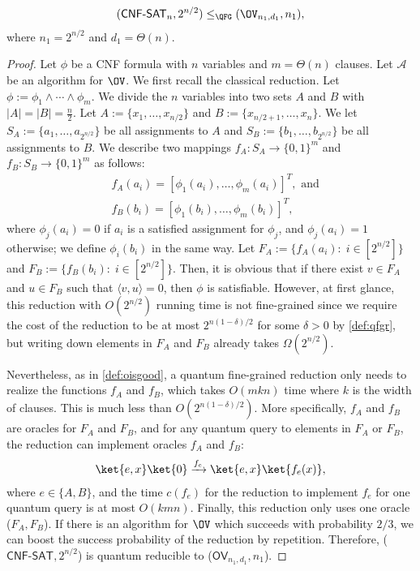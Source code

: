 \begin{lemma}\label{lem:sat_q_ov}
\begin{align}
    (\mathsf{CNF\text{-}SAT}_{n},2^{n/2})\leq_{\QFG} (\OV_{n_1,d_1},n_1),
\end{align}
where $n_1=2^{n/2}$ and $d_1=\Theta(n)$.
\end{lemma}
\begin{proof}
Let $\phi$ be a CNF formula with $n$ variables and $m=\Theta(n)$ clauses. Let $\mathcal{A}$ be an algorithm for $\OV$. We first recall the classical reduction. Let $\phi := \phi_1\wedge \cdots \wedge\phi_m$. 
We divide the $n$ variables into two sets $A$ and $B$ with $|A| = |B| = \frac{n}{2}$. Let $A:=\{x_1,\dots,x_{n/2}\}$ and $B:= \{x_{n/2+1},\dots,x_{n}\}$. We let $S_A:=\{a_1,\dots,a_{2^{n/2}}\}$ be all assignments to $A$ and $S_B:=\{b_1,\dots,b_{2^{n/2}}\}$ be all assignments to $B$. We describe two mappings $f_A: S_A\rightarrow \{0,1\}^m$ and $f_B:S_B\rightarrow \{0,1\}^m$ as follows: 
\begin{align}
    &f_A(a_i) = [\phi_1(a_i),\dots,\phi_m(a_i)]^T, \text{ and}\\
    &f_B(b_i) = [\phi_1(b_i),\dots,\phi_m(b_i)]^T,
\end{align}
where $\phi_j(a_i) = 0$ if $a_i$ is a satisfied assignment for $\phi_j$, and  $\phi_j(a_i) = 1$ otherwise; we define $\phi_i(b_i)$ in the same way. Let $F_A:= \{f_A(a_i):\; i\in[2^{n/2}]\}$ and $F_B:= \{f_B(b_i):\; i\in[2^{n/2}]\}$. Then, it is obvious that if there exist $v\in F_A$ and $u\in F_B$ such that $\langle v, u \rangle=0$, then $\phi$ is satisfiable. However, at first glance, this reduction with $O(2^{n/2})$ running time is not fine-grained since we require the cost of the reduction to be at most $2^{n(1-\delta)/2}$ for some $\delta>0$ by \cref{def:qfgr}, but writing down elements in $F_A$ and $F_B$ already takes $\Omega(2^{n/2})$. %

Nevertheless, as in \cref{def:oisgood}, a quantum fine-grained reduction only needs to realize the functions $f_A$ and $f_B$, which takes $O(mkn)$ time where $k$ is the width of clauses. This is much less than $O(2^{n(1-\delta)/2})$. More specifically,  $f_A$ and $f_B$ are oracles for $F_A$ and $F_B$, and for any quantum query to elements in $F_A$ or $F_B$, the reduction can implement oracles $f_A$ and $f_B$:   
\begin{align}
    \ket{e,x}\ket{0}\xrightarrow{f_e} \ket{e,x}\ket{f_e(x)},
\end{align}
where $e\in \{A,B\}$, and the time $c(f_e)$ for the reduction to implement $f_e$ for one quantum query is at most $O(kmn)$. Finally, this reduction only uses one oracle ($F_A,F_B$). If there is an algorithm for $\OV$ which succeeds with probability $2/3$, we can boost the success probability of the reduction by repetition.  Therefore, ($\textsf{CNF-SAT},2^{n/2}$) is quantum reducible to ($\textsf{OV}_{n_1,d_1},n_1$). 
\end{proof}


